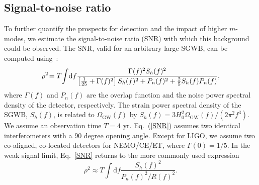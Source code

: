 \documentclass[
reprint,           %
superscriptaddress,%
amsmath,           %
amssymb,           %
aps,               %
prd,               %
notitlepage,       %
floatfix,          %
nofootinbib %
]{revtex4-1}
\def\e{\begin{equation}}
\def\q{\end{equation}}
\begin{document}
\subsection{Signal-to-noise ratio}
To further quantify the prospects for detection and the impact of higher $m$-modes, we estimate the signal-to-noise ratio (SNR) with which this background could be observed. The SNR, valid for an arbitrary large SGWB, can be computed using~\cite{Allen:1997ad}:
\e\label{SNR}
\rho^{2}\!=T \! \int \! \mathrm{d} f \frac{\Gamma(f)^{2} S_{h}(f)^{2}}{\left[{1\over 25}+\Gamma(f)^{2}\right] S_{h}(f)^{2}+P_{n}(f)^{2}+{2\over 5} S_{h}(f) P_{n}(f)},
\q
where $\Gamma(f)$ and $P_n(f)$ are the overlap function and the noise power spectral density of the detector, respectively. The strain power spectral density of the SGWB, $S_h(f)$, is related to $\Omega_{\mathrm{GW}}(f)$ by $S_h(f) = 3H_0^2\Omega_{\mathrm{GW}}(f)/(2\pi^2 f^3)$. We assume an observation time $T=4$ yr.
%
Eq.~(\ref{SNR}) assumes two identical interferometers with a $90$ degree opening angle. Except for LIGO, we assume two co-aligned, co-located detectors for NEMO/CE/ET, where $\Gamma(0)=1/5$. In the weak signal limit, Eq.~\eqref{SNR} returns to the more commonly used expression \cite{Allen:1997ad,Thrane:2013oya}
\e
\rho^{2}\!\approx T \! \int \! \mathrm{d} f \frac{S_{h}(f)^{2}}{P_{n}(f)^{2}/R(f)^{2}}.
\q
\end{document}
